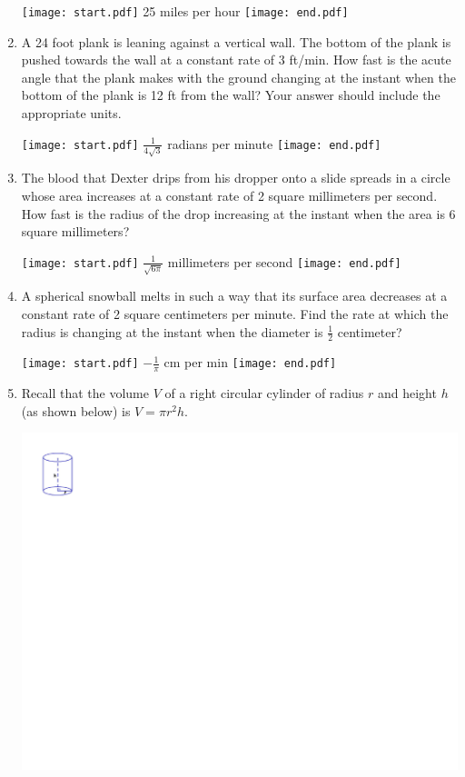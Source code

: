 \documentclass[12pt]{article}
\begin{document}
\begin{enumerate}
\texttt{[image: start.pdf]}
{{25 miles per hour}}
\texttt{[image: end.pdf]}


\item A 24 foot plank is leaning against a vertical wall.  The bottom of the plank is pushed towards the wall at a constant rate of 3 ft/min.  How fast is the acute angle that the plank makes with the ground changing at the instant when the bottom of the plank is 12 ft from the wall?  Your answer should include the appropriate units.

\texttt{[image: start.pdf]}
{{$\frac{1}{4\sqrt{3}}$ radians per minute}}
\texttt{[image: end.pdf]}


\item The blood that Dexter drips from his dropper onto a slide spreads in a circle whose area increases at a constant rate of 2 square millimeters per second.  How fast is the radius of the drop increasing at the instant when the area is 6 square millimeters? 

\texttt{[image: start.pdf]}
{{$\frac{1}{\sqrt{6\pi}}$ millimeters per second}}
\texttt{[image: end.pdf]}


\item A spherical snowball melts in such a way that its surface area decreases at a constant rate of 2 square centimeters per minute.  Find the rate at which the radius is changing at the instant when the diameter is $\frac{1}{2}$ centimeter?

\texttt{[image: start.pdf]}
{{$-\frac{1}{\pi}$ cm per min}}
\texttt{[image: end.pdf]}


\item Recall that the volume $V$ of a right circular cylinder of radius $r$ and height $h$ (as shown below) is $V=\pi r^2h$.
\begin{center}
\includegraphics[scale=.85]{cylinder.pdf}
\end{center}


\end{enumerate}
\end{document}
